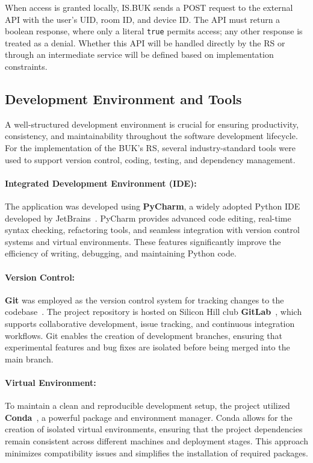 When access is granted locally, IS.BUK sends a POST request to the external API with the user's UID, room ID, and device ID. The API must return a boolean response, where only a literal \texttt{true} permits access; any other response is treated as a denial. Whether this API will be handled directly by the RS or through an intermediate service will be defined based on implementation constraints.

\subsection{Development Environment and Tools}

A well-structured development environment is crucial for ensuring productivity, consistency, and maintainability throughout the software development lifecycle. For the implementation of the BUK's RS, several industry-standard tools were used to support version control, coding, testing, and dependency management.

\paragraph{Integrated Development Environment (IDE):}
The application was developed using \textbf{PyCharm}, a widely adopted Python IDE developed by JetBrains~\cite{PyCharm}. PyCharm provides advanced code editing, real-time syntax checking, refactoring tools, and seamless integration with version control systems and virtual environments. These features significantly improve the efficiency of writing, debugging, and maintaining Python code.

\paragraph{Version Control:}
\textbf{Git} was employed as the version control system for tracking changes to the codebase~\cite{git}. The project repository is hosted on Silicon Hill club \textbf{GitLab}~\cite{GitLab}, which supports collaborative development, issue tracking, and continuous integration workflows. Git enables the creation of development branches, ensuring that experimental features and bug fixes are isolated before being merged into the main branch.

\paragraph{Virtual Environment:}
To maintain a clean and reproducible development setup, the project utilized \textbf{Conda}~\cite{conda}, a powerful package and environment manager. Conda allows for the creation of isolated virtual environments, ensuring that the project dependencies remain consistent across different machines and deployment stages. This approach minimizes compatibility issues and simplifies the installation of required packages.

